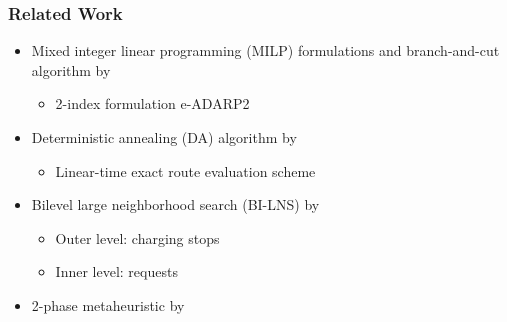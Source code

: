 \documentclass[aspectratio=1610]{beamer}
\begin{document}
\begin{frame}
  \frametitle{Related Work}
  	
\medskip
\begin{itemize}
	\item Mixed integer linear programming (MILP) formulations and branch-and-cut algorithm by \cite{Bongiovanni:2019} 
		\begin{itemize}
			\item 2-index formulation e-ADARP2 
		\end{itemize}
	\smallskip
	\item Deterministic annealing (DA) algorithm by \cite{Su:2023}
		\begin{itemize}
			\item Linear-time exact route evaluation scheme %
		\end{itemize}
	\smallskip
	\item Bilevel large neighborhood search (BI-LNS) by \cite{Limmer:2023}
		\begin{itemize}
			\item Outer level: charging stops 
			\item Inner level: requests 
		\end{itemize}
\end{itemize}

\bigskip

\medskip
\begin{itemize}
	\item 2-phase metaheuristic by \cite{Bongiovanni:2022}
\end{itemize}
  
\end{frame}
\end{document}
